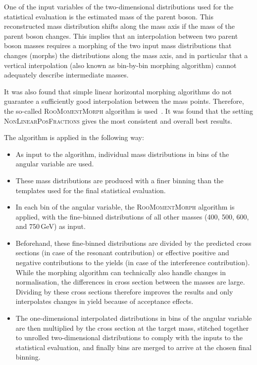 One of the input variables of the two-dimensional distributions used for the statistical evaluation is the estimated mass of the parent boson.
This reconstructed mass distribution shifts along the mass axis if the mass of the parent boson changes.
This implies that an interpolation between two parent boson masses requires a morphing of the two input mass distributions that changes (morphs) the distributions along the mass axis, and in particular that a vertical interpolation (also known as bin-by-bin morphing algorithm) cannot adequately describe intermediate masses.

It was also found that simple linear horizontal morphing algorithms do not guarantee a sufficiently good interpolation between the mass points.
Therefore, the so-called \textsc{RooMomentMorph} algorithm is used~\cite{RooMomentMorph}.
It was found that the setting \textsc{NonLinearPosFractions} gives the most consistent and overall best results.

The algorithm is applied in the following way:
\begin{itemize}
    \item As input to the algorithm, individual mass distributions in bins of the angular variable are used.
    \item These mass distributions are produced with a finer binning than the templates used for the final statistical evaluation.
    \item In each bin of the angular variable, the \textsc{RooMomentMorph} algorithm is applied, with the fine-binned distributions of all other masses (400, 500, 600, and 750\,GeV) as input.
    \item Beforehand, these fine-binned distributions are divided by the predicted cross sections (in case of the resonant contribution) or effective positive and negative contributions to the yields (in case of the interference contribution). While the morphing algorithm can technically also handle changes in normalisation, the differences in cross section between the masses are large. Dividing by these cross sections therefore improves the results and only interpolates changes in yield because of acceptance effects.
    \item The one-dimensional interpolated distributions in bins of the angular variable are then multiplied by the cross section at the target mass, stitched together to unrolled two-dimensional distributions to comply with the inputs to the statistical evaluation, and finally bins are merged to arrive at the chosen final binning.
\end{itemize}

